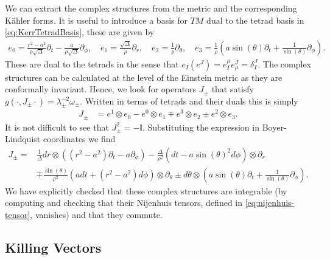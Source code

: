 \documentclass[10pt]{report}
\theoremstyle{definition}
\newcommand{\id}{\mathbb{I}}
\begin{document}
We can extract the complex structures from the metric and the corresponding K\"ahler forms.
It is useful to introduce a basis for $TM$ dual to the tetrad basis in \cref{eq:KerrTetradBasis}, these are given by
\begin{align}
    e_0 = \frac{r^2-a^2}{\rho \sqrt{\Delta}} \partial_t - \frac{a}{\rho \sqrt{\Delta}}  \partial_\phi, \quad e_1 = \frac{\sqrt{\Delta}}{\rho} \partial_r, \quad e_2 = \frac{1}{\rho}\partial_\theta, \quad e_3 = \frac{1}{\rho} \left( a \sin(\theta) \partial_t + \frac{1}{\sin(\theta)} \partial_\phi \right).
\end{align} 
These are dual to the tetrads in the sense that $e_I (e^J) = e^\mu_I e^J_\mu = \delta_I^J$.
The complex structures can be calculated at the level of the Einstein metric as they are conformally invariant.
Hence, we look for operators $J_\pm$ that satisfy $g(\cdot,J_\pm \cdot) = \lambda^{-2}_\pm \omega_\pm$.
Written in terms of tetrads and their duals this is simply
\begin{align}
    J_\pm &= e^1 \otimes e_0 - e^0 \otimes e_1 \mp e^3 \otimes e_2 \pm e^2 \otimes e_3.
\end{align}
It is not difficult to see that $J^2_\pm = - \id$. 
Substituting the expression in Boyer-Lindquist coordinates we find
\begin{align}
    J_\pm = &\frac{1}{\Delta} dr \otimes \left( (r^2-a^2) \partial_t  - a \partial_\phi \right) - \frac{\Delta}{\rho^2}(dt-a \sin(\theta)^2 d\phi) \otimes \partial_r \\
    & \mp \frac{\sin(\theta)}{\rho^2}(adt + (r^2-a^2)d\phi) \otimes \partial_\theta \pm d\theta \otimes \left( a \sin(\theta) \partial_t + \frac{1}{\sin(\theta)} \partial_\phi \right).
\end{align}
We have explicitly checked that these complex structures are integrable (by computing and checking that their Nijenhuis tensors, defined in \cref{eq:nijenhuis-tensor}, vanishes) and that they commute. 

\subsection{Killing Vectors}
\end{document}
